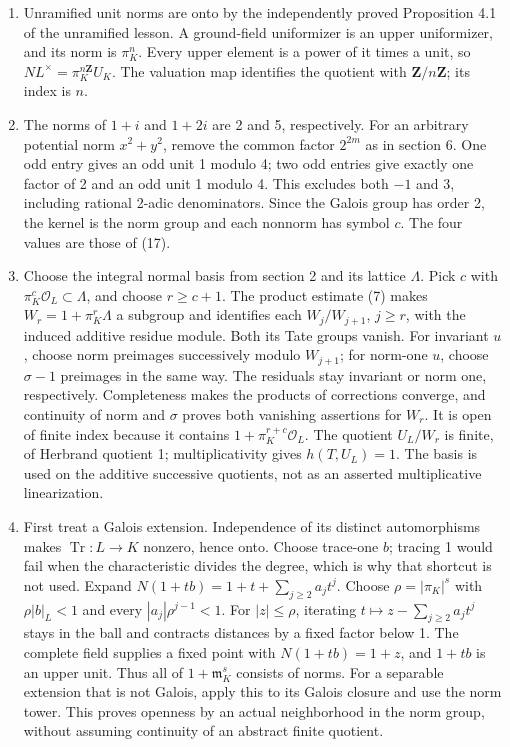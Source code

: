 \documentclass[11pt,a4paper]{article}
\newcommand{\tightlist}{\setlength{\itemsep}{0pt}\setlength{\parskip}{0pt}}
\begin{document}
\begin{enumerate}
\def\labelenumi{\arabic{enumi}.}
\tightlist
\item
  Unramified unit norms are onto by the independently proved Proposition
  4.1 of the unramified lesson. A ground-field uniformizer is an upper
  uniformizer, and its norm is \(\pi_K^n\). Every upper element is a
  power of it times a unit, so \(N L^\times=\pi_K^{n\mathbf Z}U_K\). The
  valuation map identifies the quotient with \(\mathbf Z/n\mathbf Z\);
  its index is \(n\).
\item
  The norms of \(1+i\) and \(1+2i\) are 2 and 5, respectively. For an
  arbitrary potential norm \(x^2+y^2\), remove the common factor
  \(2^{2m}\) as in section 6. One odd entry gives an odd unit 1 modulo
  4; two odd entries give exactly one factor of 2 and an odd unit 1
  modulo 4. This excludes both \(-1\) and 3, including rational 2-adic
  denominators. Since the Galois group has order 2, the kernel is the
  norm group and each nonnorm has symbol \(c\). The four values are
  those of (17).
\item
  Choose the integral normal basis from section 2 and its lattice
  \(\Lambda\). Pick \(c\) with \(\pi_K^c\mathcal O_L\subset\Lambda\),
  and choose \(r\geq c+1\). The product estimate (7) makes
  \(W_r=1+\pi_K^r\Lambda\) a subgroup and identifies each
  \(W_j/W_{j+1}\), \(j\geq r\), with the induced additive residue
  module. Both its Tate groups vanish. For invariant \(u\), choose norm
  preimages successively modulo \(W_{j+1}\); for norm-one \(u\), choose
  \(\sigma-1\) preimages in the same way. The residuals stay invariant
  or norm one, respectively. Completeness makes the products of
  corrections converge, and continuity of norm and \(\sigma\) proves
  both vanishing assertions for \(W_r\). It is open of finite index
  because it contains \(1+\pi_K^{r+c}\mathcal O_L\). The quotient
  \(U_L/W_r\) is finite, of Herbrand quotient 1; multiplicativity gives
  \(h(T,U_L)=1\). The basis is used on the additive successive
  quotients, not as an asserted multiplicative linearization.
\item
  First treat a Galois extension. Independence of its distinct
  automorphisms makes \(\operatorname{Tr}:L\to K\) nonzero, hence onto.
  Choose trace-one \(b\); tracing 1 would fail when the characteristic
  divides the degree, which is why that shortcut is not used. Expand
  \(N(1+tb)=1+t+\sum_{j\geq2}a_jt^j\). Choose \(\rho=|\pi_K|^s\) with
  \(\rho|b|_L<1\) and every \(|a_j|\rho^{j-1}<1\). For \(|z|\leq\rho\),
  iterating \(t\mapsto z-\sum_{j\geq2}a_jt^j\) stays in the ball and
  contracts distances by a fixed factor below 1. The complete field
  supplies a fixed point with \(N(1+tb)=1+z\), and \(1+tb\) is an upper
  unit. Thus all of \(1+\mathfrak m_K^s\) consists of norms. For a
  separable extension that is not Galois, apply this to its Galois
  closure and use the norm tower. This proves openness by an actual
  neighborhood in the norm group, without assuming continuity of an
  abstract finite quotient.
\end{enumerate}
\end{document}
